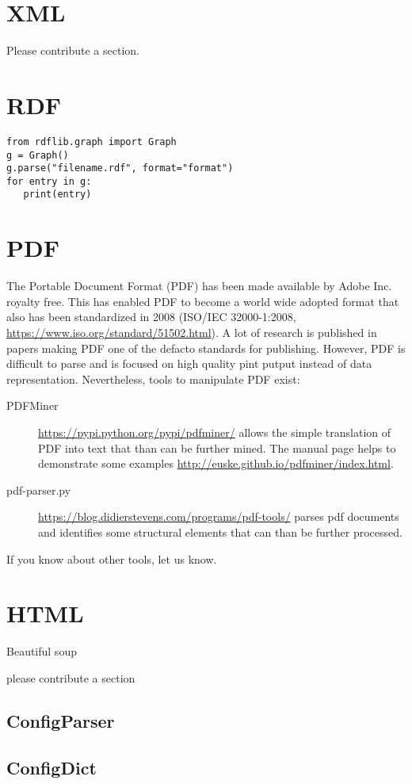 \section{XML}

Please contribute a section.

\section{RDF}

\begin{verbatim}
from rdflib.graph import Graph
g = Graph()
g.parse("filename.rdf", format="format")
for entry in g:
   print(entry)
\end{verbatim}

\section{PDF}

The Portable Document Format (PDF) has been made available by Adobe
Inc. royalty free. This has enabled PDF to become a world wide adopted
format that also has been standardized in 2008 (ISO/IEC 32000-1:2008,
\url{https://www.iso.org/standard/51502.html}).  A lot of research is
published in papers making PDF one of the defacto standards for
publishing. However, PDF is difficult to parse and is focused on high
quality pint putput instead of data representation. Nevertheless,
tools to manipulate PDF exist:

\begin{description}
\item[PDFMiner] \url{https://pypi.python.org/pypi/pdfminer/} allows
  the simple translation of PDF into text that than can be further
  mined. The manual page helps to demonstrate some examples
  \url{http://euske.github.io/pdfminer/index.html}.

\item[pdf-parser.py]
  \url{https://blog.didierstevens.com/programs/pdf-tools/} parses pdf
  documents and identifies some structural elements that can than be
  further processed.

\end{description}

If you know about other tools, let us know.


\section{HTML}

Beautiful soup

please contribute a section

\subsection{ConfigParser}


\subsection{ConfigDict}

